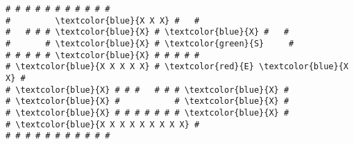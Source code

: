 \begin{Verbatim}[commandchars=\\\{\}]
# # # # # # # # # # #
#         \textcolor{blue}{X X X} #   #
#   # # # \textcolor{blue}{X} # \textcolor{blue}{X} #   #
#       # \textcolor{blue}{X} # \textcolor{green}{S}     #
# # # # # \textcolor{blue}{X} # # # # #
# \textcolor{blue}{X X X X X} # \textcolor{red}{E} \textcolor{blue}{X X} #
# \textcolor{blue}{X} # # #   # # # \textcolor{blue}{X} #
# \textcolor{blue}{X} #           # \textcolor{blue}{X} #
# \textcolor{blue}{X} # # # # # # # \textcolor{blue}{X} #
# \textcolor{blue}{X X X X X X X X X} #
# # # # # # # # # # #
\end{Verbatim}